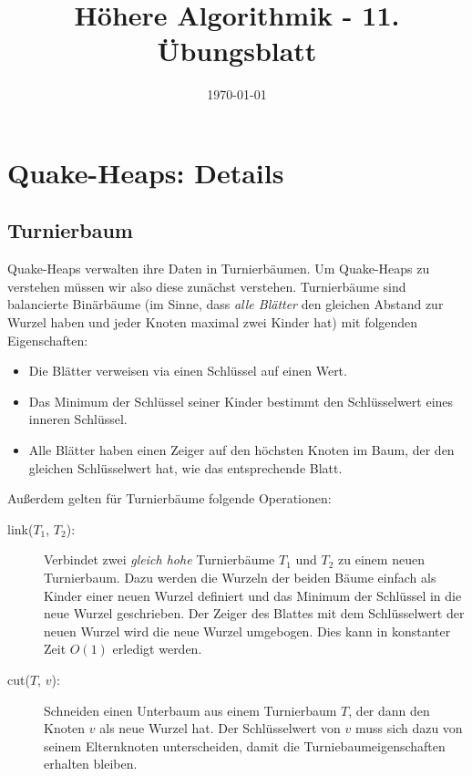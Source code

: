 \documentclass[a4paper,10pt]{article}
\title{H\"ohere Algorithmik - 11. \"Ubungsblatt}
\author{\Authors}
\date{\today}
\begin{document}
\maketitle

\section{Quake-Heaps: Details}
\subsection{Turnierbaum}
Quake-Heaps verwalten ihre Daten in Turnierbäumen. 
Um Quake-Heaps zu verstehen müssen wir also diese zunächst verstehen.
Turnierbäume sind balancierte Binärbäume (im Sinne, dass \emph{alle Blätter} den gleichen Abstand zur Wurzel haben und jeder Knoten maximal zwei Kinder hat) mit folgenden Eigenschaften:
\begin{itemize}
 \item Die Blätter verweisen via einen Schlüssel auf einen Wert.
 \item Das Minimum der Schlüssel seiner Kinder bestimmt den Schlüsselwert eines inneren Schlüssel.
 \item Alle Blätter haben einen Zeiger auf den höchsten Knoten im Baum, der den gleichen Schlüsselwert hat, wie das entsprechende Blatt.
\end{itemize}
Außerdem gelten für Turnierbäume folgende Operationen:
\begin{description}
\item[link($T_1$, $T_2$):]
    Verbindet zwei \emph{gleich hohe} Turnierbäume $T_1$ und $T_2$ zu einem neuen Turnierbaum. 
    Dazu werden die Wurzeln der beiden Bäume einfach als Kinder einer neuen Wurzel definiert und das Minimum der Schlüssel in die neue Wurzel geschrieben. 
    Der Zeiger des Blattes mit dem Schlüsselwert der neuen Wurzel wird die neue Wurzel umgebogen.
    Dies kann in konstanter Zeit $O(1)$ erledigt werden.
\item[cut($T$, $v$):]
    Schneiden einen Unterbaum aus einem Turnierbaum $T$, der dann den Knoten $v$ als neue Wurzel hat. 
    Der Schlüsselwert von $v$ muss sich dazu von seinem Elternknoten unterscheiden, damit die Turniebaumeigenschaften erhalten bleiben.
\end{description}
\end{document}
